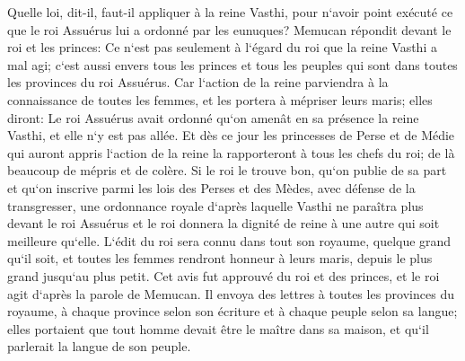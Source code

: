 \verse Quelle loi, dit-il, faut-il appliquer à la reine Vasthi, pour n`avoir point exécuté ce que le roi Assuérus lui a ordonné par les eunuques? 
\verse Memucan répondit devant le roi et les princes: Ce n`est pas seulement à l`égard du roi que la reine Vasthi a mal agi; c`est aussi envers tous les princes et tous les peuples qui sont dans toutes les provinces du roi Assuérus. 
\verse Car l`action de la reine parviendra à la connaissance de toutes les femmes, et les portera à mépriser leurs maris; elles diront: Le roi Assuérus avait ordonné qu`on amenât en sa présence la reine Vasthi, et elle n`y est pas allée. 
\verse Et dès ce jour les princesses de Perse et de Médie qui auront appris l`action de la reine la rapporteront à tous les chefs du roi; de là beaucoup de mépris et de colère. 
\verse Si le roi le trouve bon, qu`on publie de sa part et qu`on inscrive parmi les lois des Perses et des Mèdes, avec défense de la transgresser, une ordonnance royale d`après laquelle Vasthi ne paraîtra plus devant le roi Assuérus et le roi donnera la dignité de reine à une autre qui soit meilleure qu`elle. 
\verse L`édit du roi sera connu dans tout son royaume, quelque grand qu`il soit, et toutes les femmes rendront honneur à leurs maris, depuis le plus grand jusqu`au plus petit. 
\verse Cet avis fut approuvé du roi et des princes, et le roi agit d`après la parole de Memucan. 
\verse Il envoya des lettres à toutes les provinces du royaume, à chaque province selon son écriture et à chaque peuple selon sa langue; elles portaient que tout homme devait être le maître dans sa maison, et qu`il parlerait la langue de son peuple. 

